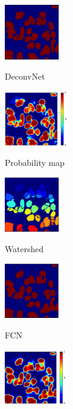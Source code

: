 \documentclass{article}
\begin{document}
\begin{figure}[htb]
%
%
\begin{minipage}[b]{0.32\linewidth}
  \centering
  \centerline{\includegraphics[height=2.4cm]{DeconvNetB}}
  \centerline{DeconvNet}\medskip
\end{minipage}
\hfill
\begin{minipage}[b]{.32\linewidth}
  \centering
  \centerline{\includegraphics[height=2.4cm]{DeconvNetP}}
  \centerline{Probability map}\medskip
\end{minipage}
\hfill
\begin{minipage}[b]{.32\linewidth}
  \centering
  \centerline{\includegraphics[height=2.4cm]{DeconvNet_WS}}
  \centerline{Watershed}\medskip
\end{minipage}
%
\begin{minipage}[b]{0.32\linewidth}
  \centering
  \centerline{\includegraphics[height=2.4cm]{FCNB}}
  \centerline{FCN}\medskip
\end{minipage}
\hfill
\begin{minipage}[b]{.32\linewidth}
  \centering
  \centerline{\includegraphics[height=2.4cm]{FCNP}}

\end{minipage}
\end{figure}
\end{document}
